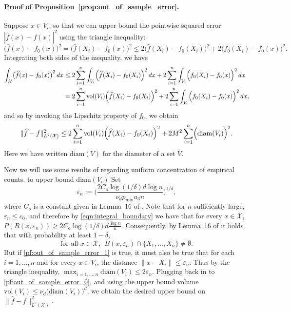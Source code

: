 \documentclass[twoside]{article}
\newcommand{\diam}{\mathrm{diam}}
\newcommand{\vol}{\text{vol}}
\newcommand{\1}{\mathbf{1}}
\newcommand{\Xset}{\mathcal{X}}
\newcommand{\Leb}{L}
\newcommand{\mc}[1]{\mathcal{#1}}
\newcommand{\dx}{\,dx}
\newcommand{\wh}[1]{\widehat{#1}}
\theoremstyle{definition}
\theoremstyle{remark}
\begin{document}
\paragraph{Proof of Proposition~\ref{prop:out_of_sample_error}.}
Suppose $x \in V_i$, so that we can upper bound the pointwise squared error $|\wh{f}(x) - f(x)|^2$ using the triangle inequality:
\begin{equation*}
\bigl(\wh{f}(x) - f_0(x)\bigr)^2 = \bigl(\wh{f}(X_i) - f_0(x)\bigr)^2 \leq 2\bigl(\wh{f}(X_i) - f_0(X_i)\bigr)^2 + 2\bigl(f_0(X_i) - f_0(x)\bigr)^2.
\end{equation*}
Integrating both sides of the inequality, we have
\begin{align*}
\int_{\Xset} \bigl(\wh{f}(x) - f_0(x)\bigr)^2 \,dx & \leq 2  \sum_{i = 1}^{n} \int_{V_i} \Bigl(\wh{f}(X_i) - f_0(X_i)\Bigr)^2 \,dx + 2 \sum_{i = 1}^{n} \int_{V_i} \Bigl(f_0(X_i) - f_0(x)\Bigr)^2 \dx \\
& = 2 \sum_{i = 1}^{n} \vol(V_i) \Bigl(\wh{f}(X_i) - f_0(X_i)\Bigr)^2 + 2 \sum_{i = 1}^{n} \int_{V_i} \Bigl(f_0(X_i) - f_0(x)\Bigr)^2 \dx,
\end{align*}
and so by invoking the Lipschitz property of $f_0$, we obtain
\begin{equation}
\label{pf:out_of_sample_error_0}
\|\wh{f} - f\|_{\Leb^2(\Xset)}^2 \leq 2 \sum_{i = 1}^{n} \vol(V_i) \Bigl(\wh{f}(X_i) - f_0(X_i)\Bigr)^2 + 2 M^2 \sum_{i = 1}^{n} \Bigl(\mathrm{diam}(V_i)\Bigr)^2.
\end{equation}
Here we have written $\mathrm{diam}(V)$ for the diameter of a set $V$. 

Now we will use some results of \citet{chaudhuri2010} regarding uniform concentration of empirical counts, to upper bound $\diam(V_i)$ Set
\begin{equation*}
\varepsilon_n := \biggl(\frac{2C_{o}\log(1/\delta)d\log n}{\nu_dp_{\min}a_3n}\biggr)^{1/d},
\end{equation*}
where $C_{o}$ is a constant given in Lemma~16 of \citet{chaudhuri2010}. Note that for $n$ sufficiently large, $\varepsilon_n \leq c_0$, and therefore by \eqref{eqn:integral_boundary} we have that for every $x \in \Xset$, $P(B(x,\varepsilon_n)) \geq 2C_{o}\log(1/\delta)d\frac{\log n}{n}$. Consequently, by Lemma~16 of \citet{chaudhuri2010} it holds that with probability at least $1 - \delta$,
\begin{equation}
\label{pf:out_of_sample_error_1}
\textrm{for all $x \in \mc{X}$},~~ B(x,\varepsilon_n) \cap \{X_1,\ldots,X_n\} \neq \emptyset.
\end{equation}
But if \eqref{pf:out_of_sample_error_1} is true, it must also be true that for each $i = 1,\ldots,n$ and for every $x \in V_i$, the distance $\|x - X_i\| \leq \varepsilon_n$. Thus by the triangle inequality, $\max_{i = 1,\ldots,n} \mathrm{diam}(V_i) \leq 2\varepsilon_n$. Plugging back in to \eqref{pf:out_of_sample_error_0}, and using the upper bound volume $\vol(V_i) \leq \nu_d \bigl(\mathrm{diam}(V_i)\bigr)^d$, we obtain the desired upper bound on $\|\wh{f} - f\|_{\Leb^2(\Xset)}^2$.
\end{document}

